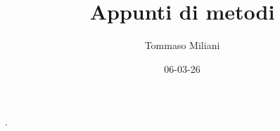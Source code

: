 \documentclass[a4paper, oneside]{article}
\title{Appunti di metodi}
\author{Tommaso Miliani}
\date{06-03-26}
\begin{document}
                {}          %
                {}          %
                {\slshape}  %
                {}          %
                {\bfseries} %
                {.}         %
                {\newline}  %
                {}          %
\theoremstyle{theoremEnv}

\newtheorem{definition}{Definizione}[section]
\newtheorem{theorem}{Teorema}[section]
\newtheorem{lemma}{Proposizione}[section]
\newtheorem{observation}{Osservazione}[section]
\newtheorem{corollary}{Corollario}[theorem]
\newtheorem{example}{Esempio}[section]
\newtheorem{remark}{Enunciato}[section]

\maketitle
\end{document}

